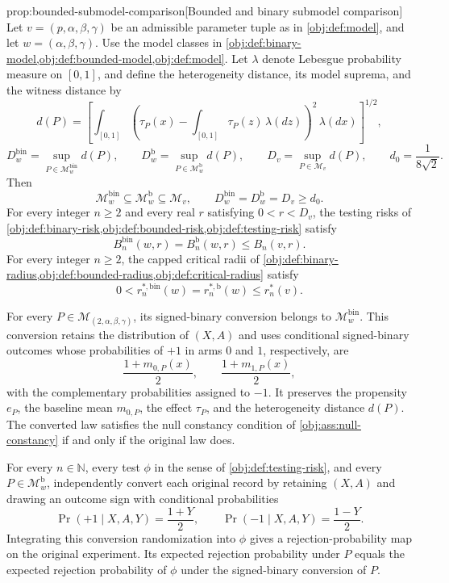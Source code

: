 \documentclass[11pt]{article}
\begin{document}
\begin{propositionv}{prop:bounded-submodel-comparison}[Bounded and binary submodel comparison]
Let \(v=(p,\alpha,\beta,\gamma)\) be an admissible parameter tuple as in \cref{obj:def:model}, and let \(w=(\alpha,\beta,\gamma)\). Use the model classes in \cref{obj:def:binary-model,obj:def:bounded-model,obj:def:model}. Let \(\lambda\) denote Lebesgue probability measure on \([0,1]\), and define the heterogeneity distance, its model suprema, and the witness distance by
\[
d(P)=
\left[
\int_{[0,1]}
\left(\tau_P(x)-\int_{[0,1]}\tau_P(z)\,\lambda(dz)\right)^2
\,\lambda(dx)
\right]^{1/2},
\]
\[
D_w^{\mathrm{bin}}=\sup_{P\in\mathcal M^{\mathrm{bin}}_w}d(P),
\qquad
D_w^{\mathrm b}=\sup_{P\in\mathcal M^{\mathrm b}_w}d(P),
\qquad
D_v=\sup_{P\in\mathcal M_v}d(P),
\qquad
d_0=\frac{1}{8\sqrt{2}}.
\]
Then
\[
\mathcal M^{\mathrm{bin}}_w\subseteq\mathcal M^{\mathrm b}_w
\subseteq\mathcal M_v,
\qquad
D_w^{\mathrm{bin}}=D_w^{\mathrm b}=D_v\ge d_0.
\]
For every integer \(n\ge2\) and every real \(r\) satisfying \(0<r<D_v\), the testing risks of \cref{obj:def:binary-risk,obj:def:bounded-risk,obj:def:testing-risk} satisfy
\[
B_n^{\mathrm{bin}}(w,r)=B_n^{\mathrm b}(w,r)\le B_n(v,r).
\]
For every integer \(n\ge2\), the capped critical radii of \cref{obj:def:binary-radius,obj:def:bounded-radius,obj:def:critical-radius} satisfy
\[
0<r_n^{*,\mathrm{bin}}(w)
=r_n^{*,\mathrm b}(w)\le r_n^*(v).
\]

For every \(P\in\mathcal M_{(2,\alpha,\beta,\gamma)}\), its signed-binary conversion belongs to \(\mathcal M^{\mathrm{bin}}_w\). This conversion retains the distribution of \((X,A)\) and uses conditional signed-binary outcomes whose probabilities of \(+1\) in arms \(0\) and \(1\), respectively, are
\[
\frac{1+m_{0,P}(x)}{2},
\qquad
\frac{1+m_{1,P}(x)}{2},
\]
with the complementary probabilities assigned to \(-1\). It preserves the propensity \(e_P\), the baseline mean \(m_{0,P}\), the effect \(\tau_P\), and the heterogeneity distance \(d(P)\). The converted law satisfies the null constancy condition of \cref{obj:ass:null-constancy} if and only if the original law does.

For every \(n\in\mathbb N\), every test \(\phi\) in the sense of \cref{obj:def:testing-risk}, and every \(P\in\mathcal M^{\mathrm b}_w\), independently convert each original record by retaining \((X,A)\) and drawing an outcome sign with conditional probabilities
\[
\Pr(+1\mid X,A,Y)=\frac{1+Y}{2},
\qquad
\Pr(-1\mid X,A,Y)=\frac{1-Y}{2}.
\]
Integrating this conversion randomization into \(\phi\) gives a rejection-probability map on the original experiment. Its expected rejection probability under \(P\) equals the expected rejection probability of \(\phi\) under the signed-binary conversion of \(P\).
\end{propositionv}
\end{document}
